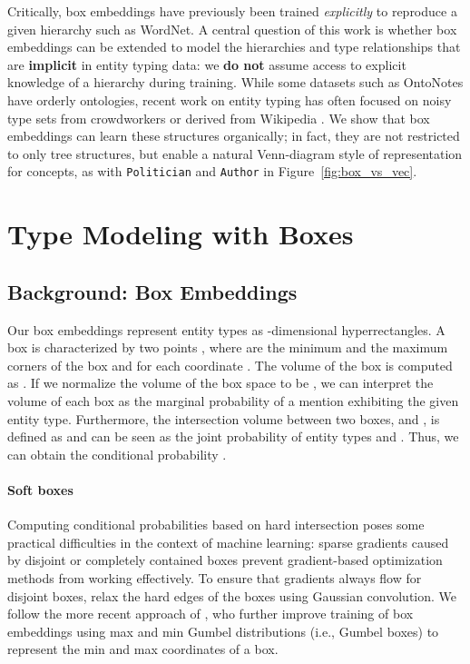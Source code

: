 \documentclass[11pt,a4paper]{article}
\begin{document}
Critically, box embeddings have previously been trained \emph{explicitly} to reproduce a given hierarchy such as WordNet. A central question of this work is whether box embeddings can be extended to model the hierarchies and type relationships that are \textbf{implicit} in entity typing data: we \textbf{do not} assume access to explicit knowledge of a hierarchy during training. While some datasets such as OntoNotes have orderly ontologies, recent work on entity typing has often focused on noisy type sets from crowdworkers \cite{Eunsol_Choi_18} or derived from Wikipedia \cite{Yasumasa_Onoe_20}. We show that box embeddings can learn these structures organically; in fact, they are not restricted to only tree structures, but enable a natural Venn-diagram style of representation for concepts, as with {\tt Politician} and {\tt Author} in Figure~\ref{fig:box_vs_vec}.



\section{Type Modeling with Boxes}
\label{sec:types_with_boxes}

\subsection{Background: Box Embeddings}
\label{sec:background}
Our box embeddings represent entity types as -dimensional hyperrectangles. A box  is characterized by two points , where  are the minimum and the maximum corners of the box  and  for each coordinate . The volume of the box  is computed as . If we normalize the volume of the box space to be , we can interpret the volume of each box as the marginal probability of a mention exhibiting the given entity type. Furthermore, the intersection volume between two boxes,  and , is defined as  and can be seen as the joint probability of entity types  and . Thus, we can obtain the conditional probability . 

\paragraph{Soft boxes}
Computing conditional probabilities based on hard intersection poses some practical difficulties in the context of machine learning: sparse gradients caused by disjoint or completely contained boxes prevent gradient-based optimization methods from working effectively.
To ensure that gradients always flow for disjoint boxes, \citet{Xiang_Li_19} relax the hard edges of the boxes using Gaussian convolution. We follow the more recent approach of \citet{Shib_Sankar_Dasgupta_20}, who further improve training of box embeddings using max and min Gumbel distributions (i.e., Gumbel boxes) to represent the min and max coordinates of a box.
\end{document}
